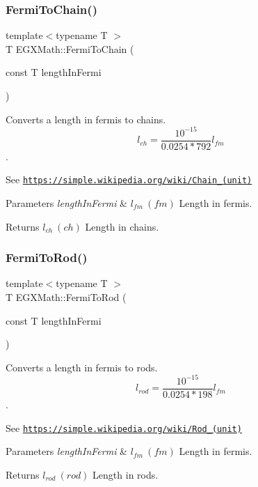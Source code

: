 \subsubsection{\texorpdfstring{Fermi\+To\+Chain()}{FermiToChain()}}
{\footnotesize\ttfamily template$<$typename T $>$ \\
T E\+G\+X\+Math\+::\+Fermi\+To\+Chain (\begin{DoxyParamCaption}\item[{const T}]{length\+In\+Fermi }\end{DoxyParamCaption})}



Converts a length in fermis to chains. \[ l_{ch}= \frac{10^{-15}}{0.0254 * 792} l_{fm} \]. 

See \href{https://simple.wikipedia.org/wiki/Chain_(unit)}{\tt https\+://simple.\+wikipedia.\+org/wiki/\+Chain\+\_\+(unit)} 
\begin{DoxyParams}{Parameters}
{\em length\+In\+Fermi} & $ l_{fm}\ (fm)$ Length in fermis. \\
\hline
\end{DoxyParams}
\begin{DoxyReturn}{Returns}
$ l_{ch}\ (ch)$ Length in chains. 
\end{DoxyReturn}
\mbox{\label{group___e_g_x_math-_conversions-_length_conversions-_non-_s_i-_fermi-_surveyors_ga45d5bb796dd61d3b2f81d45dafbc682d}} 
\subsubsection{\texorpdfstring{Fermi\+To\+Rod()}{FermiToRod()}}
{\footnotesize\ttfamily template$<$typename T $>$ \\
T E\+G\+X\+Math\+::\+Fermi\+To\+Rod (\begin{DoxyParamCaption}\item[{const T}]{length\+In\+Fermi }\end{DoxyParamCaption})}



Converts a length in fermis to rods. \[ l_{rod}= \frac{10^{-15}}{0.0254 * 198} l_{fm} \]. 

See \href{https://simple.wikipedia.org/wiki/Rod_(unit)}{\tt https\+://simple.\+wikipedia.\+org/wiki/\+Rod\+\_\+(unit)} 
\begin{DoxyParams}{Parameters}
{\em length\+In\+Fermi} & $ l_{fm}\ (fm)$ Length in fermis. \\
\hline
\end{DoxyParams}
\begin{DoxyReturn}{Returns}
$ l_{rod}\ (rod)$ Length in rods. 
\end{DoxyReturn}
